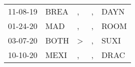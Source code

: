 \begin{supertabular}{p{0.07\textwidth}p{0.06\textwidth}p{0.02\textwidth}p{0.02\textwidth}p{0.06\textwidth}}
          11-08-19\textsuperscript{} &           BREA\textsuperscript{} &                , &                , &           DAYN\textsuperscript{} \\
          01-24-20\textsuperscript{} &            MAD\textsuperscript{} &                , &                , &           ROOM\textsuperscript{} \\
          03-07-20\textsuperscript{} &           BOTH\textsuperscript{} &     \textgreater &                , &           SUXI\textsuperscript{} \\
          10-10-20\textsuperscript{} &           MEXI\textsuperscript{} &                , &                , &           DRAC\textsuperscript{} \\
\end{supertabular}

